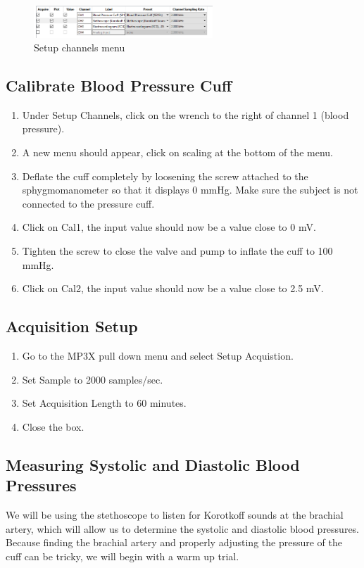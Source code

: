 \documentclass{article}
\begin{document}
\begin{figure}[h]
\centering\includegraphics[width=0.6\textwidth]{../images/BP_7.png}
\caption{Setup channels menu}
\label{setup}
\end{figure}

\subsection*{Calibrate Blood Pressure Cuff}
\begin{enumerate}
	\item Under Setup Channels, click on the wrench to the right of channel 1 (blood pressure).
	\item A new menu should appear, click on scaling at the bottom of the menu.
	\item Deflate the cuff completely by loosening the screw attached to the sphygmomanometer so that it displays 0 mmHg. Make sure the subject is not connected to the pressure cuff.
	\item Click on Cal1, the input value should now be a value close to 0 mV.
	\item Tighten the screw to close the valve and pump to inflate the cuff to 100 mmHg.
	\item Click on Cal2, the input value should now be a value close to 2.5 mV.
\end{enumerate}

\subsection*{Acquisition Setup}
\begin{enumerate}
	\item Go to the MP3X pull down menu and select Setup Acquistion.
		\item Set Sample to 2000 samples/sec.
		\item Set Acquisition Length to 60 minutes.
		\item Close the box.
\end{enumerate}

\subsection*{Measuring Systolic and Diastolic Blood Pressures}
We will be using the stethoscope to listen for Korotkoff sounds at the brachial artery, which will allow us to determine the systolic and diastolic blood pressures. Because finding the brachial artery and properly adjusting the pressure of the cuff can be tricky, we will begin with a warm up trial.
\end{document}
